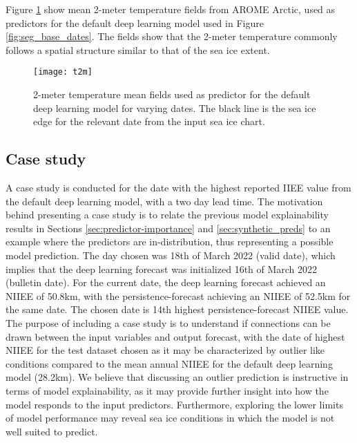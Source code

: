 \documentclass[../main/thesis.tex]{subfiles}
\begin{document}
Figure \ref{fig:t2m_dates} show mean 2-meter temperature fields from AROME Arctic, used as predictors for the default deep learning model used in Figure \ref{fig:seg_base_dates}. The fields show that the 2-meter temperature commonly follows a spatial structure similar to that of the sea ice extent.

\begin{figure}
    \centering
    \texttt{[image: t2m]}
    \caption{\label{fig:t2m_dates}2-meter temperature mean fields used as predictor for the default deep learning model for varying dates. The black line is the sea ice edge for the relevant date from the input sea ice chart.}
\end{figure}

\subsection{Case study}
A case study is conducted for the date with the highest reported IIEE value from the default deep learning model, with a two day lead time. The motivation behind presenting a case study is to relate the previous model explainability results in Sections \ref{sec:predictor-importance} and \ref{sec:synthetic_preds} to an example where the predictors are in-distribution, thus representing a possible model prediction. The day chosen was 18th of March 2022 (valid date), which implies that the deep learning forecast was initialized 16th of March 2022 (bulletin date). For the current date, the deep learning forecast achieved an NIIEE of 50.8km, with the persistence-forecast achieving an NIIEE of 52.5km for the same date. The chosen date is 14th highest persistence-forecast NIIEE value. The purpose of including a case study is to understand if connections can be drawn between the input variables and output forecast, with the date of highest NIIEE for the test dataset chosen as it may be characterized by outlier like conditions compared to the mean annual NIIEE for the default deep learning model (28.2km). We believe that discussing an outlier prediction is instructive in terms of model explainability, as it may provide further insight into how the model responds to the input predictors. Furthermore, exploring the lower limits of model performance may reveal sea ice conditions in which the model is not well suited to predict.
\end{document}
